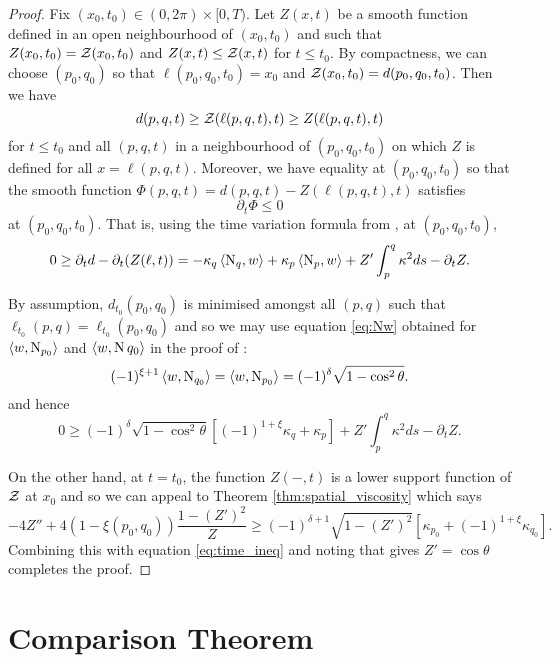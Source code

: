 \documentclass[a4paper, 12pt]{amsart}
\begin{document}
\begin{proof}
Fix $(x_0,t_0) \in (0,2\pi) \times [0,T)$. Let $Z(x,t)$ be a smooth function defined in an open neighbourhood of $(x_0,t_0)$ and such that $Z(x_0, t_0) = \operatorname{\mathcal{Z}}(x_0, t_0)$ and $Z(x, t) \leq \operatorname{\mathcal{Z}}(x, t)$ for $t\leq t_0$. By compactness, we can choose $(p_0,q_0)$ so that $\ell(p_0, q_0, t_0) = x_0$ and $\operatorname{\mathcal{Z}}(x_0, t_0) = d(p_0, q_0, t_0)$.  Then we have
\[
d(p, q, t) \geq \operatorname{\mathcal{Z}}(\ell(p, q, t), t) \geq Z(\ell(p, q, t), t)
\]
for $t\leq t_0$ and all $(p,q,t)$ in a neighbourhood of $(p_0,q_0,t_0)$ on which $Z$ is defined for all $x=\ell(p,q,t)$. Moreover, we have equality at $(p_0, q_0, t_0)$ so that the smooth function $\Phi(p, q, t) = d(p,q,t) - Z(\ell(p, q, t), t)$ satisfies
\[
\partial_t \Phi \leq 0
\]
at $(p_0, q_0, t_0)$. That is, using the time variation formula from , at \((p_0, q_0, t_0)\),
\[
0 \geq \partial_t d - \partial_t (Z(\ell, t)) = -\kappa_q \left\langle \operatorname{N}_q,w \right\rangle + \kappa_p \left\langle \operatorname{N}_p,w \right\rangle + Z' \int_p^q \kappa^2 ds - \partial_t Z.
\]

By assumption, \(d_{t_0} (p_0, q_0)\) is minimised amongst all \((p, q)\) such that \(\ell_{t_0}(p, q) = \ell_{t_0}(p_0, q_0)\) and so we may use equation \eqref{eq:Nw} obtained for $\left\langle w,\operatorname{N}_{p_0} \right\rangle$ and $\left\langle w,\operatorname{N}{q_0} \right\rangle$ in the proof of :
\[
(-1)^{\xi+1} \left\langle w,\operatorname{N}_{q_0} \right\rangle = \left\langle w,\operatorname{N}_{p_0} \right\rangle =  (-1)^\delta \sqrt{1-\cos^2\theta}.
\]
and hence
\begin{equation}
\label{eq:time_ineq}
0 \geq (-1)^\delta \sqrt{1-\cos^2\theta} [(-1)^{1+\xi}\kappa_q + \kappa_p] + Z' \int_p^q \kappa^2 ds - \partial_t Z.
\end{equation}

On the other hand, at $t=t_0$, the function $Z(-, t)$ is a lower support function of $\operatorname{\mathcal{Z}}$ at $x_0$ and so we can appeal to Theorem \ref{thm:spatial_viscosity} which says
\[
-4Z'' + 4(1-\xi(p_0,q_0)) \frac{1 - (Z')^2}{Z} \geq (-1)^{\delta+1} \sqrt{1 - (Z')^2} \left[\kappa_{p_0} + (-1)^{1+\xi} \kappa_{q_0}\right].
\]
Combining this with equation \eqref{eq:time_ineq} and noting that  gives \(Z' = \cos\theta\) completes the proof.
\end{proof}

\section{Comparison Theorem}
\label{sec:comparison}
\end{document}
